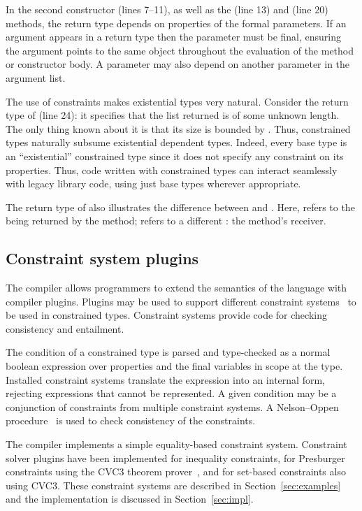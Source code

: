 In the second constructor (lines 7--11), as well as 
the  (line 13) and  (line 20) methods,
the return type
depends on properties of the formal parameters. 
If an argument appears in a
return type then the parameter must be final,
ensuring the
argument points to the same object throughout the evaluation of
the method or constructor body.  A parameter may also depend on
another parameter in the argument list.

The use of constraints makes existential types very natural.
Consider the return type of  (line 24): it specifies
that the list returned is of some unknown length. The only thing
known about it is that its size is bounded by .
Thus,
constrained types naturally subsume existential dependent types.
Indeed, every base type  is an ``existential''
constrained type since it does not specify any constraint on its
properties. Thus, code written with constrained types can
interact seamlessly with legacy library code, using just base
types wherever appropriate.

The return type of  also illustrates the difference
between  and .  Here,  refers to
the  being returned by the method;  refers
to a different : the method's receiver.

\subsection{Constraint system plugins}

The \Xten{} compiler allows  
programmers to extend the semantics of the language with
compiler plugins.  Plugins may be used to support different constraint
systems~\cite{cccc} to be used in constrained types.
Constraint systems provide code for checking consistency and
entailment.

The condition of a constrained type is parsed and type-checked
as a normal boolean expression over properties and
the final variables in scope at the type.  Installed
constraint systems translate the expression into an internal
form, rejecting expressions that cannot be represented.
%
A given condition may be a conjunction of constraints from
multiple constraint systems.
A Nelson--Oppen procedure~\cite{nelson-oppen} is used to check
consistency of the constraints.

The \Xten{} compiler
implements a simple
equality-based constraint system.  Constraint solver plugins
have been implemented for inequality constraints, for
Presburger constraints using
the CVC3 theorem prover~\cite{cvc}, and for
set-based constraints also using CVC3.
These constraint systems are described in
Section~\ref{sec:examples} and the implementation is
discussed in Section~\ref{sec:impl}.

